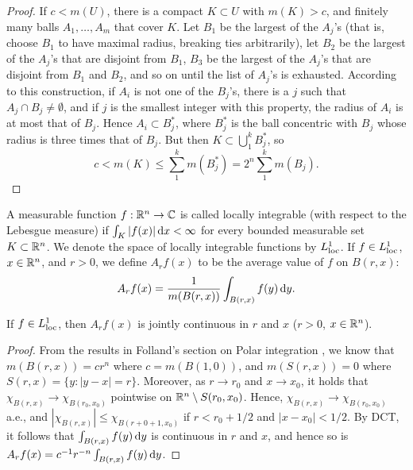\documentclass[12pt]{article} %
\begin{document}
\begin{proof}
    If $c < m(U)$, there is a compact $K \subset U$ with $m(K) > c$, and finitely many balls $A_1, \ldots, A_m$ that cover $K$. Let $B_1$ be the largest of the $A_j$'s (that is, choose $B_1$ to have maximal radius, breaking ties arbitrarily), let $B_2$ be the largest of the $A_j$'s that are disjoint from $B_1$, $B_3$ be the largest of the $A_j$'s that are disjoint from $B_1$ and $B_2$, and so on until the list of $A_j$'s is exhausted. According to this construction, if $A_i$ is not one of the $B_j$'s, there is a $j$ such that $A_j 
    \cap B_j \neq \emptyset$, and if $j$ is the smallest integer with this property, the radius of $A_i$ is at most that of $B_j$. Hence $A_i \subset B_j^*$, where $B_j^*$ is the ball concentric with $B_j$ whose radius is three times that of $B_j$. But then $K \subset \bigcup_1^k B_j^*$, so \[c < m(K) \leq \sum_1^k m(B_j^*) = 2^n \sum_1^k m(B_j).\]
\end{proof}

\begin{definition}
    A measurable function $f : \mathbb{R}^n \to \mathbb{C}$ is called locally integrable (with respect to the Lebesgue measure) if $\int_K |f(x)|\, \mathrm{d} x < \infty$ for every bounded measurable set $K \subset \mathbb{R}^n$. We denote the space of locally integrable functions by $L_{\operatorname{loc}}^1$. If $f \in L_{\operatorname{loc}}^1$, $x \in \mathbb{R}^n$, and $r > 0$, we define $A_r f(x)$ to be the average value of $f$ on $B(r, x)$: \[A_r f(x) = \frac{1}{m(B(r, x))} \int_{B(r, x)} f(y) \, \mathrm{d} y.\]
\end{definition}

\begin{lemma}
    If $f \in L_{\operatorname{loc}}^1$, then $A_r f(x)$ is jointly continuous in $r$ and $x$ ($r > 0$, $x \in \mathbb{R}^n$).
\end{lemma}

\begin{proof}
    From the results in Folland's section on Polar integration , we know that $m(B(r, x)) = cr^n$ where $c = m(B(1, 0))$, and $m(S(r, x)) = 0$ where $S(r, x) = \{y : |y-x| = r\}$. Moreover, as $r \to r_0$ and $x \to x_0$, it holds that $\chi_{B(r, x)} \to \chi_{B(r_0, x_0)}$ pointwise on $\mathbb{R}^n \setminus S(r_0, x_0)$. Hence, $\chi_{B(r, x)} \to \chi_{B(r_0, x_0)}$ a.e., and $|\chi_{B(r, x)}| \leq \chi_{B(r+0 + 1, x_0)}$ if $r < r_0 + 1/2$ and $|x-x_0| < 1/2$. By DCT, it follows that $\int_{B(r, x)}f(y)\, \mathrm{d} y$ is continuous in $r$ and $x$, and hence so is $A_r f(x) = c^{-1}r^{-n} \int_{B(r, x)} f(y) \, \mathrm{d} y$.
\end{proof}
\end{document}
